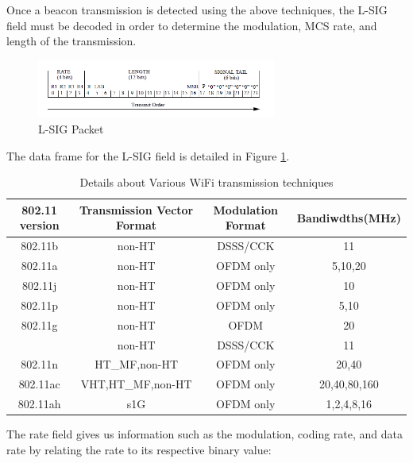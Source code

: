 Once a beacon transmission is detected using the above techniques, the L-SIG field must be decoded in order to determine the modulation, MCS rate, and length of the transmission.
\begin{figure}[ht!]
	\centering
	\includegraphics[width=0.70\textwidth]{img/lsig_packet}
	\caption{L-SIG Packet}
	\label{fig:lsig_packet}
\end{figure}\par
 The data frame for the L-SIG field is detailed in Figure \ref{fig:lsig_packet}.
\begin{table}[ht!]
	\centering
	\begin{tabular}{|c|c|c|c|}
		\hline
		802.11 version & Transmission Vector Format & Modulation Format & Bandiwdths(MHz) \\
		\hline
		802.11b & non-HT & DSSS/CCK & 11 \\
		802.11a & non-HT & OFDM only & 5,10,20 \\
		802.11j & non-HT & OFDM only & 10 \\
		802.11p & non-HT & OFDM only& 5,10 \\
		802.11g & non-HT & OFDM& 20 \\
			    & non-HT & DSSS/CCK& 11 \\
		802.11n & HT\_MF,non-HT & OFDM only & 20,40 \\
		802.11ac & VHT,HT\_MF,non-HT & OFDM only & 20,40,80,160 \\
		802.11ah & s1G & OFDM only & 1,2,4,8,16 \\
		\hline
	\end{tabular}
	\caption{Details about Various WiFi transmission techniques}
	\label{table:WiFi_table}
\end{table} \par
The rate field gives us information such as the modulation, coding rate, and data rate by relating the rate to its respective binary value:

